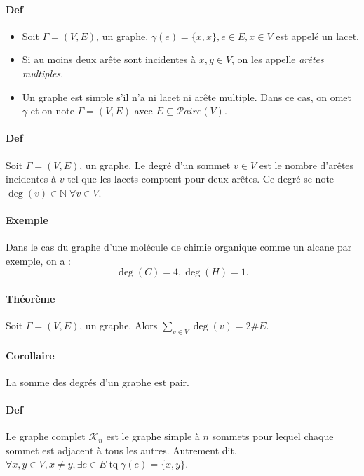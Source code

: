 \documentclass{article}
\newenvironment{lst}
	{\begin{minipage}[t]{.9\linewidth}\begin{itemize}}
	{\end{itemize}\end{minipage}}
\DeclareMathOperator{\tq}{\text{ tq }}
\begin{document}
			\paragraph{Def}
				\begin{lst}
					\item Soit $\Gamma = (V, E)$, un graphe. $\gamma(e) = \{x, x\}, e \in E, x\in V$ est appelé un lacet.
					\item Si au moins deux arête sont incidentes à $x, y \in V$, on les appelle \textit{arêtes multiples}.
					\item Un graphe est simple s'il n'a ni lacet ni arête multiple. Dans ce cas, on omet $\gamma$ et on note $\Gamma = (V, E)$
						  avec $E \subseteq \mathcal Paire(V)$.
				\end{lst}

			\paragraph{Def} Soit $\Gamma = (V, E)$, un graphe. Le degré d'un sommet $v \in V$ est le nombre d'arêtes incidentes à $v$ tel que
			les lacets comptent pour deux arêtes. Ce degré se note $\deg(v) \in \mathbb N \; \forall v \in V$.

			\paragraph{Exemple} Dans le cas du graphe d'une molécule de chimie organique comme un alcane par exemple, on a :
			\[\deg(C) = 4, \deg(H) = 1.\]

			\paragraph{Théorème} Soit $\Gamma = (V, E)$, un graphe. Alors $\sum_{v \in V}\deg(v) = 2\#E$.

			\paragraph{Corollaire} La somme des degrés d'un graphe est pair.

			\paragraph{Def} Le graphe complet $\mathcal K_n$ est le graphe simple à $n$ sommets pour lequel chaque sommet est adjacent à tous
			les autres. Autrement dit, $\forall x, y \in V, x \neq y, \exists e \in E \tq \gamma(e) = \{x, y\}$.
\end{document}
